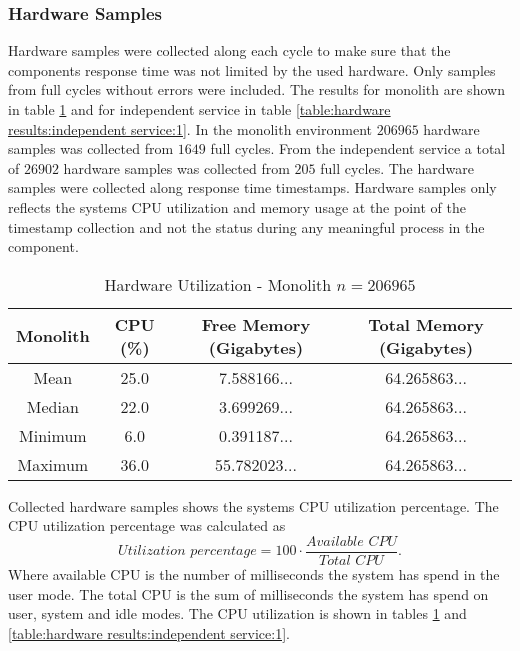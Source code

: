 \subsubsection{Hardware Samples}
Hardware samples were collected along each cycle to make sure that the components response time was not limited by the used hardware.
Only samples from full cycles without errors were included.
The results for monolith are shown in table \ref{table:hardware results:monolith:1} and for independent service in table \ref{table:hardware results:independent service:1}.
In the monolith environment $206965$ hardware samples was collected from $1649$ full cycles.
From the independent service a total of $26902$ hardware samples was collected from $205$ full cycles.
The hardware samples were collected along response time timestamps.
Hardware samples only reflects the systems CPU utilization and memory usage at the point of the timestamp collection and not the status during any meaningful process in the component.

\begin{table}[ht!]
    \begin{tabular}{|c|c|c|c|} 
        \hline
        Monolith
        & CPU (\%)
        & Free Memory (Gigabytes)
        & Total Memory (Gigabytes) \\ [0.5ex] 
        
        \hline\hline
        Mean
        & 25.0
        & 7.588166...
        & 64.265863... \\ 
        
        Median
        & 22.0
        & 3.699269...
        & 64.265863... \\ 

        Minimum
        & 6.0
        & 0.391187...
        & 64.265863... \\ 
        
        Maximum
        & 36.0
        & 55.782023...
        & 64.265863... \\
        \hline
    \end{tabular}
    \caption{Hardware Utilization - Monolith $n=206 965$}
    \label{table:hardware results:monolith:1}
\end{table}

Collected hardware samples shows the systems CPU utilization percentage.
The CPU utilization percentage was calculated as
\[
\textit{Utilization percentage} = 100 \cdot \frac{\textit{Available CPU}}{\textit{Total CPU}}
.\]
Where available CPU is the number of milliseconds the system has spend in the user mode.
The total CPU is the sum of milliseconds the system has spend on user, system and idle modes. The CPU utilization is shown in tables \ref{table:hardware results:monolith:1} and \ref{table:hardware results:independent service:1}.

